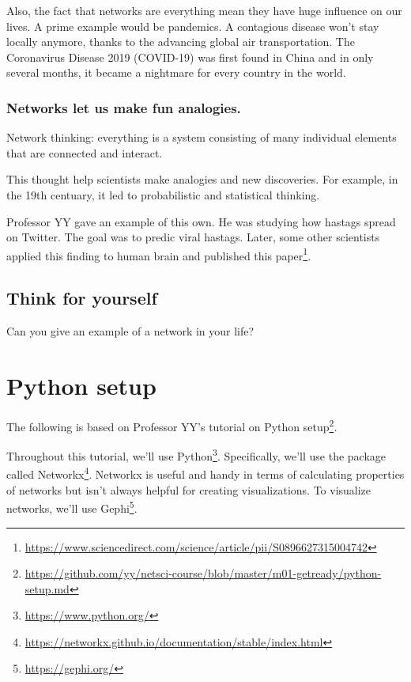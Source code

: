\documentclass[
]{krantz}
\makeatletter
\renewcommand{\href}[2]{#2\footnote{\url{#1}}}
\newenvironment{kframe}{%
\medskip{}
\setlength{\fboxsep}{.8em}
 \def\at@end@of@kframe{}%
 \ifinner\ifhmode%
  \def\at@end@of@kframe{\end{minipage}}%
  \begin{minipage}{\columnwidth}%
 \fi\fi%
 \def\FrameCommand##1{\hskip\@totalleftmargin \hskip-\fboxsep
 \colorbox{shadecolor}{##1}\hskip-\fboxsep
     \hskip-\linewidth \hskip-\@totalleftmargin \hskip\columnwidth}%
 \MakeFramed {\advance\hsize-\width
   \@totalleftmargin\z@ \linewidth\hsize
   \@setminipage}}%
 {\par\unskip\endMakeFramed%
 \at@end@of@kframe}
\newenvironment{rmdblock}[1]
  {
  \begin{itemize}
  \renewcommand{\labelitemi}{
    \raisebox{-.7\height}[0pt][0pt]{
      {\setkeys{Gin}{width=3em,keepaspectratio}\texttt{[image: images/\#1]}}
    }
  }
  \setlength{\fboxsep}{1em}
  \begin{kframe}
  \item
  }
  {
  \end{kframe}
  \end{itemize}
  }
\newenvironment{rmdnote}
  {\begin{rmdblock}{note}}
  {\end{rmdblock}}
\makeatother
\begin{document}
Also, the fact that networks are everything mean they have huge influence on our lives. A prime example would be pandemics. A contagious disease won't stay locally anymore, thanks to the advancing global air transportation. The Coronavirus Disease 2019 (COVID-19) was first found in China and in only several months, it became a nightmare for every country in the world.

\hypertarget{networks-let-us-make-fun-analogies.}{%
\subsubsection{Networks let us make fun analogies.}\label{networks-let-us-make-fun-analogies.}}

Network thinking: everything is a system consisting of many individual elements that are connected and interact.

This thought help scientists make analogies and new discoveries. For example, in the 19th centuary, it led to probabilistic and statistical thinking.

Professor YY gave an example of this own. He was studying how hastags spread on Twitter. The goal was to predic viral hastags. Later, some other scientists applied this finding to human brain and published \href{https://www.sciencedirect.com/science/article/pii/S0896627315004742}{this paper}.

\hypertarget{think-for-yourself}{%
\subsection{Think for yourself}\label{think-for-yourself}}

Can you give an example of a network in your life?

\hypertarget{python-setup}{%
\section{Python setup}\label{python-setup}}

\begin{rmdnote}
The following is based on Professor YY's \href{https://github.com/yy/netsci-course/blob/master/m01-getready/python-setup.md}{tutorial on Python setup}.
\end{rmdnote}

Throughout this tutorial, we'll use \href{https://www.python.org/}{Python}. Specifically, we'll use the package called \href{https://networkx.github.io/documentation/stable/index.html}{Networkx}. Networkx is useful and handy in terms of calculating properties of networks but isn't always helpful for creating visualizations. To visualize networks, we'll use \href{https://gephi.org/}{Gephi}.
\end{document}
